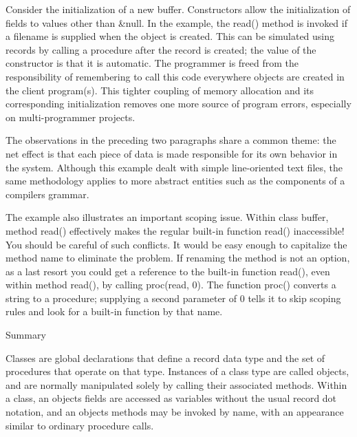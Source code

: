 Consider the initialization of a new buffer. Constructors allow the
initialization of fields to values other than \textsf{\&null}. In the
example, the \textsf{read()} method is invoked if a filename is
supplied when the object is created. This can be simulated using
records by calling a procedure after the record is created; the value
of the constructor is that it is automatic.
The programmer is freed from the responsibility of remembering to call
this code everywhere objects are created in the client program(s). This
tighter coupling of memory allocation and its
corresponding initialization removes one more source of program errors,
especially on multi-programmer projects. 

The observations in the preceding two paragraphs share a common theme:
the net effect is that each piece of data is made responsible for its
own behavior in the system. Although this example dealt with simple
line-oriented text files, the same methodology applies to more abstract
entities such as the components of a
compiler{\textquotesingle}s grammar.

The example also illustrates an important scoping issue. Within class
buffer, method \textsf{read()} effectively makes the regular built-in
function \textsf{read()} inaccessible! You should be careful of such
conflicts. It would be easy enough to capitalize the method name to
eliminate the problem. If renaming the method is not an option, as a
last resort you could get a reference to the built-in function
\textsf{read()}, even within method \textsf{read()}, by calling
\textsf{proc({\textquotedbl}read{\textquotedbl}, 0)}. The function
\textsf{proc()} converts a string to a procedure; supplying a second
parameter of 0 tells it to skip scoping rules and look for a built-in
function by that name.

{\sffamily
Summary}

Classes are global declarations that define a record data type and the
set of procedures that operate on that type. Instances of a class type
are called objects, and are normally manipulated solely by calling
their associated methods. Within a class, an object{\textquotesingle}s
fields are accessed as variables without the usual record dot notation,
and an object{\textquotesingle}s methods may be invoked by name, with
an appearance similar to ordinary procedure calls.


\bigskip

\clearpage
\bigskip
